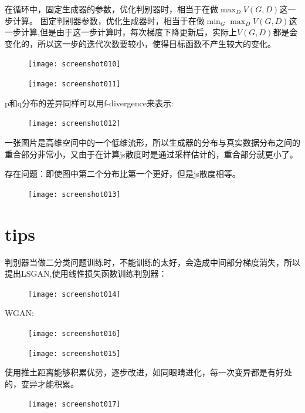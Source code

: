 \documentclass[UTF8]{ctexart} %
\begin{document}
	在循环中，固定生成器的参数，优化判别器时，相当于在做$\max_DV(G,D)$这一步计算。
	固定判别器参数，优化生成器时，相当于在做$\min_G\max_DV(G,D)$这一步计算,但是由于这一步计算时，每次梯度下降更新后，实际上$V(G,D)$都是会变化的，所以这一步的迭代次数要较小，使得目标函数不产生较大的变化。
	\begin{figure}[H]
	\centering
	\texttt{[image: screenshot010]}
	\caption{}
	\label{fig:screenshot010}
	\end{figure}
	
	\begin{figure}[H]
	\centering
	\texttt{[image: screenshot011]}
	\caption{}
	\label{fig:screenshot011}
	\end{figure}
	
	p和q分布的差异同样可以用f-divergence来表示:
	\begin{figure}[H]
	\centering
	\texttt{[image: screenshot012]}
	\caption{}
	\label{fig:screenshot012}
	\end{figure}
	
	一张图片是高维空间中的一个低维流形，所以生成器的分布与真实数据分布之间的重合部分非常小，又由于在计算js散度时是通过采样估计的，重合部分就更小了。
	
	存在问题：即使图中第二个分布比第一个更好，但是js散度相等。
	\begin{figure}[H]
	\centering
	\texttt{[image: screenshot013]}
	\caption{}
	\label{fig:screenshot013}
	\end{figure}
	
	
	\section{tips}
	
	
	判别器当做二分类问题训练时，不能训练的太好，会造成中间部分梯度消失，所以提出LSGAN,使用线性损失函数训练判别器：
	\begin{figure}[H]
	\centering
	\texttt{[image: screenshot014]}
	\caption{}
	\label{fig:screenshot014}
	\end{figure}
	
	WGAN:
	\begin{figure}[H]
	\centering
	\texttt{[image: screenshot016]}
	\caption{}
	\label{fig:screenshot016}
	\end{figure}


	\begin{figure}[H]
	\centering
	\texttt{[image: screenshot015]}
	\caption{}
	\label{fig:screenshot015}
	\end{figure}

	使用推土距离能够积累优势，逐步改进，如同眼睛进化，每一次变异都是有好处的，变异才能积累。
	\begin{figure}[H]
	\centering
	\texttt{[image: screenshot017]}
	\caption{}
	\label{fig:screenshot017}
	\end{figure}
	
\end{document}

